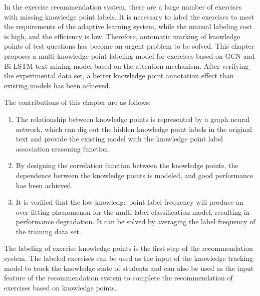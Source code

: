 
In the exercise recommendation system, there are a large number of exercises with missing knowledge point labels. It is necessary to label the exercises to meet the requirements of the adaptive learning system, while the manual labeling cost is high, and the efficiency is low. Therefore, automatic marking of knowledge points of test questions has become an urgent problem to be solved. This chapter proposes a multi-knowledge point labeling model for exercises based on GCN and Bi-LSTM text mining model based on the attention mechanism. After verifying the experimental data set, a better knowledge point annotation effect than existing models has been achieved.

The contributions of this chapter are as follows:
\begin{enumerate}
	\item The relationship between knowledge points is represented by a graph neural network, which can dig out the hidden knowledge point labels in the original text and provide the existing model with the knowledge point label association reasoning function.
	\item By designing the correlation function between the knowledge points, the dependence between the knowledge points is modeled, and good performance has been achieved.
	\item It is verified that the low-knowledge point label frequency will produce an over-fitting phenomenon for the multi-label classification model, resulting in performance degradation. It can be solved by averaging the label frequency of the training data set.
\end{enumerate}

The labeling of exercise knowledge points is the first step of the recommendation system. The labeled exercises can be used as the input of the knowledge tracking model to track the knowledge state of students and can also be used as the input feature of the recommendation system to complete the recommendation of exercises based on knowledge points.

